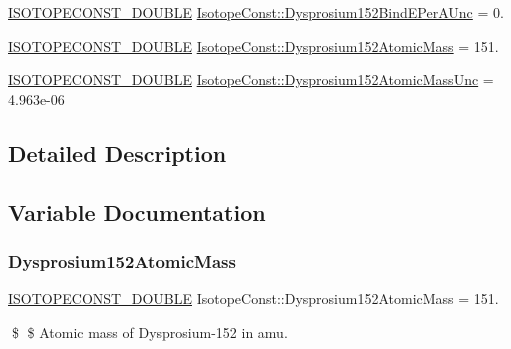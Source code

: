 \begin{DoxyCompactItemize}
\item 
\mbox{\hyperlink{group___isotope_const-_macros_ga8f45a7272ce02c0b4c65c44636ed719a}{I\+S\+O\+T\+O\+P\+E\+C\+O\+N\+S\+T\+\_\+\+D\+O\+U\+B\+LE}} \mbox{\hyperlink{group___isotope_const-_dysprosium-_dy152_ga049f843447b829967db335acef9c444f}{Isotope\+Const\+::\+Dysprosium152\+Bind\+E\+Per\+A\+Unc}} = 0.
\item 
\mbox{\hyperlink{group___isotope_const-_macros_ga8f45a7272ce02c0b4c65c44636ed719a}{I\+S\+O\+T\+O\+P\+E\+C\+O\+N\+S\+T\+\_\+\+D\+O\+U\+B\+LE}} \mbox{\hyperlink{group___isotope_const-_dysprosium-_dy152_gacca7263ffa6951ede8eacc9f4fa8ab00}{Isotope\+Const\+::\+Dysprosium152\+Atomic\+Mass}} = 151.
\item 
\mbox{\hyperlink{group___isotope_const-_macros_ga8f45a7272ce02c0b4c65c44636ed719a}{I\+S\+O\+T\+O\+P\+E\+C\+O\+N\+S\+T\+\_\+\+D\+O\+U\+B\+LE}} \mbox{\hyperlink{group___isotope_const-_dysprosium-_dy152_ga490de3a691ef74af3b51b6d5f510eaf0}{Isotope\+Const\+::\+Dysprosium152\+Atomic\+Mass\+Unc}} = 4.\+963e-\/06
\end{DoxyCompactItemize}


\subsection{Detailed Description}


\subsection{Variable Documentation}
\mbox{\label{group___isotope_const-_dysprosium-_dy152_gacca7263ffa6951ede8eacc9f4fa8ab00}} 
\subsubsection{\texorpdfstring{Dysprosium152\+Atomic\+Mass}{Dysprosium152AtomicMass}}
{\footnotesize\ttfamily \mbox{\hyperlink{group___isotope_const-_macros_ga8f45a7272ce02c0b4c65c44636ed719a}{I\+S\+O\+T\+O\+P\+E\+C\+O\+N\+S\+T\+\_\+\+D\+O\+U\+B\+LE}} Isotope\+Const\+::\+Dysprosium152\+Atomic\+Mass = 151.}

\$ \$ Atomic mass of Dysprosium-\/152 in amu. \mbox{\label{group___isotope_const-_dysprosium-_dy152_ga490de3a691ef74af3b51b6d5f510eaf0}} 
